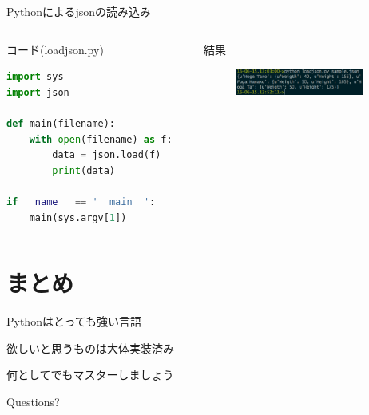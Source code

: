 \documentclass[12pt, dvipdfmx]{beamer}
\begin{document}
\begin{frame}[fragile]{Pythonによるjsonの読み込み}
    \begin{columns}[t]
        \begin{column}{0.5\textwidth}
            \begin{block}{コード(loadjson.py)}
\begin{lstlisting}[language=Python,basicstyle=\tiny\ttfamily, keywordstyle=\color{blue}\ttfamily, stringstyle=\color{red}]
import sys
import json

def main(filename):
    with open(filename) as f:
        data = json.load(f)
        print(data)

if __name__ == '__main__':
    main(sys.argv[1])
\end{lstlisting}
            \end{block}
        \end{column}
        \begin{column}{0.5\textwidth}
            \begin{block}{結果}
                \begin{figure}[h]
                    \centering
                    \includegraphics[width=4.2cm]{img/load_json_result.png}
                \end{figure}
            \end{block}
        \end{column}
    \end{columns}
\end{frame}

\section{まとめ}
\begin{frame}
Pythonはとっても強い言語

\pause
欲しいと思うものは大体実装済み

\pause
\alert{何としてでもマスターしましょう}
\end{frame}
\begin{frame}[standout]
  Questions?
\end{frame}
\end{document}
